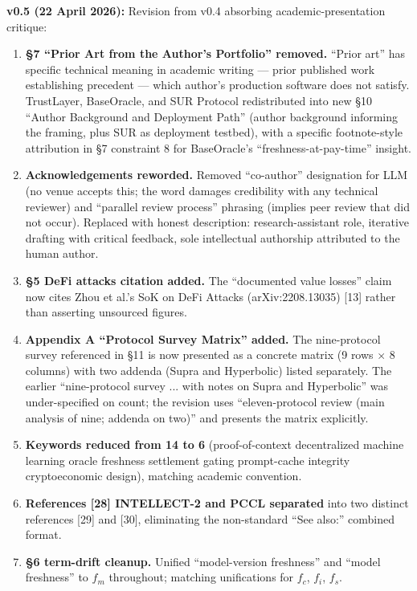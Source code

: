 \documentclass[11pt]{article}
\begin{document}
\textbf{v0.5 (22 April 2026):} Revision from v0.4 absorbing academic-presentation critique:

\begin{enumerate}
\item \textbf{\S7 ``Prior Art from the Author's Portfolio'' removed.} ``Prior art'' has specific technical meaning in academic writing --- prior published work establishing precedent --- which author's production software does not satisfy. TrustLayer, BaseOracle, and SUR Protocol redistributed into new \S10 ``Author Background and Deployment Path'' (author background informing the framing, plus SUR as deployment testbed), with a specific footnote-style attribution in \S7 constraint 8 for BaseOracle's ``freshness-at-pay-time'' insight.
\item \textbf{Acknowledgements reworded.} Removed ``co-author'' designation for LLM (no venue accepts this; the word damages credibility with any technical reviewer) and ``parallel review process'' phrasing (implies peer review that did not occur). Replaced with honest description: research-assistant role, iterative drafting with critical feedback, sole intellectual authorship attributed to the human author.
\item \textbf{\S5 DeFi attacks citation added.} The ``documented value losses'' claim now cites Zhou et al.'s SoK on DeFi Attacks (arXiv:2208.13035) [13] rather than asserting unsourced figures.
\item \textbf{Appendix A ``Protocol Survey Matrix'' added.} The nine-protocol survey referenced in \S11 is now presented as a concrete matrix (9 rows $\times$ 8 columns) with two addenda (Supra and Hyperbolic) listed separately. The earlier ``nine-protocol survey ... with notes on Supra and Hyperbolic'' was under-specified on count; the revision uses ``eleven-protocol review (main analysis of nine; addenda on two)'' and presents the matrix explicitly.
\item \textbf{Keywords reduced from 14 to 6} (proof-of-context \textperiodcentered{} decentralized machine learning \textperiodcentered{} oracle freshness \textperiodcentered{} settlement gating \textperiodcentered{} prompt-cache integrity \textperiodcentered{} cryptoeconomic design), matching academic convention.
\item \textbf{References [28] INTELLECT-2 and PCCL separated} into two distinct references [29] and [30], eliminating the non-standard ``See also:'' combined format.
\item \textbf{\S6 term-drift cleanup.} Unified ``model-version freshness'' and ``model freshness'' to $f_m$ throughout; matching unifications for $f_c$, $f_i$, $f_s$.

\end{enumerate}
\end{document}
